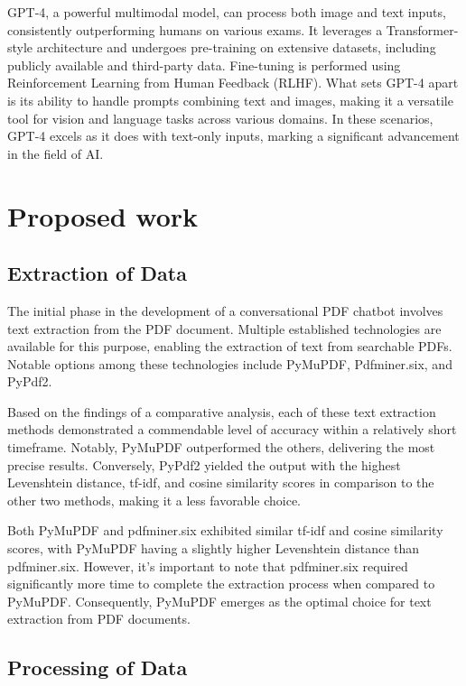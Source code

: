 \documentclass[conference]{IEEEtran}
\begin{document}
GPT-4, a powerful multimodal model, can process both image and text inputs, consistently outperforming humans on various exams. It leverages a Transformer-style architecture and undergoes pre-training on extensive datasets, including publicly available and third-party data. Fine-tuning is performed using Reinforcement Learning from Human Feedback (RLHF). What sets GPT-4 apart is its ability to handle prompts combining text and images, making it a versatile tool for vision and language tasks across various domains. In these scenarios, GPT-4 excels as it does with text-only inputs, marking a significant advancement in the field of AI.
 
\section{Proposed work}

\subsection{Extraction of Data}

The initial phase in the development of a conversational PDF chatbot involves text extraction from the PDF document. Multiple established technologies are available for this purpose, enabling the extraction of text from searchable PDFs. Notable options among these technologies include PyMuPDF, Pdfminer.six, and PyPdf2.

Based on the findings of a comparative analysis, each of these text extraction methods demonstrated a commendable level of accuracy within a relatively short timeframe. Notably, PyMuPDF outperformed the others, delivering the most precise results. Conversely, PyPdf2 yielded the output with the highest Levenshtein distance, tf-idf, and cosine similarity scores in comparison to the other two methods, making it a less favorable choice.

Both PyMuPDF and pdfminer.six exhibited similar tf-idf and cosine similarity scores, with PyMuPDF having a slightly higher Levenshtein distance than pdfminer.six. However, it's important to note that pdfminer.six required significantly more time to complete the extraction process when compared to PyMuPDF. Consequently, PyMuPDF emerges as the optimal choice for text extraction from PDF documents.

\subsection{Processing of Data}
\end{document}
